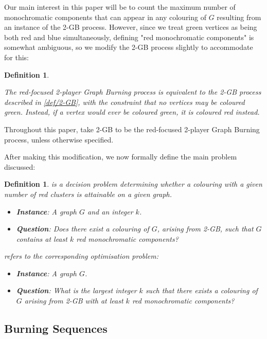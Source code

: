 \documentclass{mpaper}
\newtheorem{definition}[theorem]{Definition}
\begin{document}
Our main interest in this paper will be to count the maximum number of monochromatic components that can appear in any colouring of $G$ resulting from an instance of the 2-GB process. However, since we treat green vertices as being both red and blue simultaneously, defining "red monochromatic components" is somewhat ambiguous, so we modify the 2-GB process slightly to accommodate for this:

\begin{definition}
  \label{def/2-GB-modified}
  
  The \emph{red-focused} 2-player Graph Burning process is equivalent to the 2-GB process described in \ref{def/2-GB}, with the constraint that no vertices may be coloured green. Instead, if a vertex would ever be coloured green, it is coloured red instead.
\end{definition}

Throughout this paper, take 2-GB to be the red-focused 2-player Graph Burning process, unless otherwise specified.

After making this modification, we now formally define the main problem discussed:

\begin{definition}
  \label{def/cluster-counting}
  \kcluster is a decision problem determining whether a colouring with a given number of red clusters is attainable on a given graph.
  
  \begin{itemize}
      \item \textbf{Instance}: A graph $G$ and an integer $k$.
      \item \textbf{Question}: Does there exist a colouring of $G$, arising from 2-GB, such that $G$ contains at least $k$ red monochromatic components?
  \end{itemize}
  
  \maxcluster refers to the corresponding optimisation problem:
  
  \begin{itemize}
      \item \textbf{Instance}: A graph $G$.
      \item \textbf{Question}: What is the largest integer $k$ such that there exists a colouring of $G$ arising from 2-GB with at least $k$ red monochromatic components?
  \end{itemize}
  
\end{definition}

\subsection{Burning Sequences}
\vspace{1em}
\end{document}
